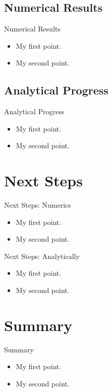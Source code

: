 \documentclass{beamer}
\begin{document}
\subsection{Numerical Results}

\begin{frame}{Numerical Results}
	\begin{itemize}
		\item {
			My first point.
		}
		\item {
			My second point.
		}
	\end{itemize}
\end{frame}

\subsection{Analytical Progress}

\begin{frame}{Analytical Progress}
	\begin{itemize}
		\item {
			My first point.
		}
		\item {
			My second point.
		}
	\end{itemize}
\end{frame}


\section{Next Steps}
\begin{frame}{Next Steps: Numerics}
	\begin{itemize}
		\item {
			My first point.
		}
		\item {
			My second point.
		}
	\end{itemize}
\end{frame}

\begin{frame}{Next Steps: Analytically}
	\begin{itemize}
		\item {
			My first point.
		}
		\item {
			My second point.
		}
	\end{itemize}
\end{frame}

\section*{Summary}
\begin{frame}{Summary}
	\begin{itemize}
		\item {
			My first point.
		}
		\item {
			My second point.
		}
	\end{itemize}
\end{frame}
\end{document}
